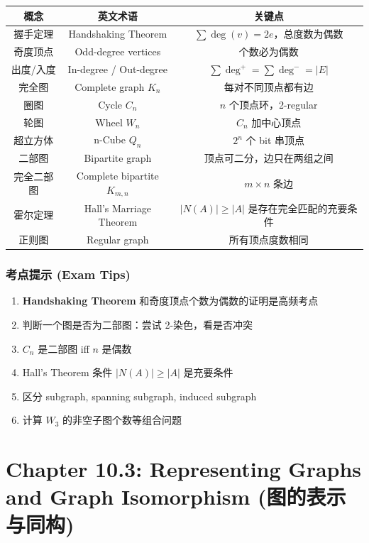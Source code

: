 \documentclass[10pt,a4paper,openany]{ctexbook}
\theoremstyle{definition}
\theoremstyle{remark}
\begin{document}
\begin{center}
\begin{tabular}{ccc}
\hline
概念 & 英文术语 & 关键点 \\ \hline
握手定理 & Handshaking Theorem & $\sum \deg(v) = 2e$，总度数为偶数 \\
奇度顶点 & Odd-degree vertices & 个数必为偶数 \\
出度/入度 & In-degree / Out-degree & $\sum \deg^+ = \sum \deg^- = |E|$ \\
完全图 & Complete graph $K_n$ & 每对不同顶点都有边 \\
圈图 & Cycle $C_n$ & $n$ 个顶点环，2-regular \\
轮图 & Wheel $W_n$ & $C_n$ 加中心顶点 \\
超立方体 & n-Cube $Q_n$ & $2^n$ 个 bit 串顶点 \\
二部图 & Bipartite graph & 顶点可二分，边只在两组之间 \\
完全二部图 & Complete bipartite $K_{m,n}$ & $m \times n$ 条边 \\
霍尔定理 & Hall's Marriage Theorem & $|N(A)| \ge |A|$ 是存在完全匹配的充要条件 \\
正则图 & Regular graph & 所有顶点度数相同 \\
\hline
\end{tabular}

\end{center}

\subsubsection{考点提示 (Exam Tips)}

\begin{enumerate}
\item \textbf{Handshaking Theorem} 和奇度顶点个数为偶数的证明是高频考点
\item 判断一个图是否为二部图：尝试 2-染色，看是否冲突
\item $C_n$ 是二部图 iff $n$ 是偶数
\item Hall's Theorem 条件 $|N(A)| \ge |A|$ 是充要条件
\item 区分 subgraph, spanning subgraph, induced subgraph
\item 计算 $W_3$ 的非空子图个数等组合问题

\end{enumerate}


\section{Chapter 10.3: Representing Graphs and Graph Isomorphism (图的表示与同构)}
\end{document}
